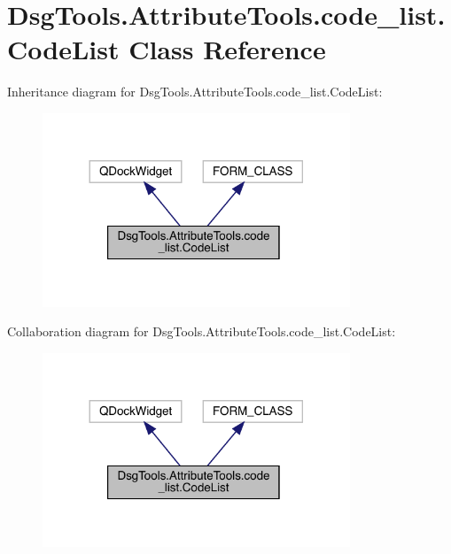 \hypertarget{class_dsg_tools_1_1_attribute_tools_1_1code__list_1_1_code_list}{}\section{Dsg\+Tools.\+Attribute\+Tools.\+code\+\_\+list.\+Code\+List Class Reference}
\label{class_dsg_tools_1_1_attribute_tools_1_1code__list_1_1_code_list}


Inheritance diagram for Dsg\+Tools.\+Attribute\+Tools.\+code\+\_\+list.\+Code\+List\+:
\nopagebreak
\begin{figure}[H]
\begin{center}
\leavevmode
\includegraphics[width=260pt]{class_dsg_tools_1_1_attribute_tools_1_1code__list_1_1_code_list__inherit__graph}
\end{center}
\end{figure}


Collaboration diagram for Dsg\+Tools.\+Attribute\+Tools.\+code\+\_\+list.\+Code\+List\+:
\nopagebreak
\begin{figure}[H]
\begin{center}
\leavevmode
\includegraphics[width=260pt]{class_dsg_tools_1_1_attribute_tools_1_1code__list_1_1_code_list__coll__graph}
\end{center}
\end{figure}

